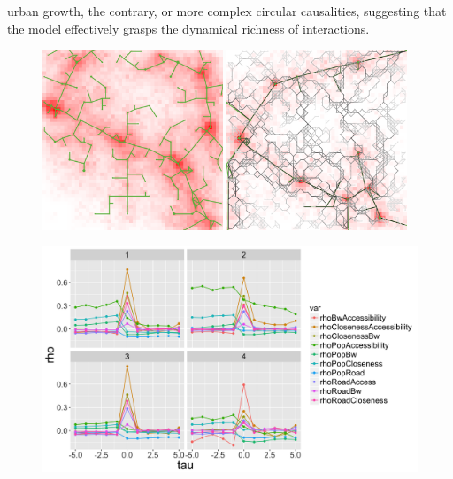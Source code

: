 urban growth, the contrary, or more complex circular causalities, suggesting that the model effectively grasps the dynamical richness of interactions.




\medskip

\begin{figure}[h]
\begin{minipage}[b]{0.52\linewidth}
\includegraphics[width=0.48\textwidth]{figures/example-heuristic-0}
\includegraphics[width=0.48\textwidth]{figures/example-bio-process-0}
\end{minipage}
\begin{minipage}[b]{0.42\linewidth}
\includegraphics[width=\textwidth]{figures/centertrajs}

\end{minipage}
\end{figure}
